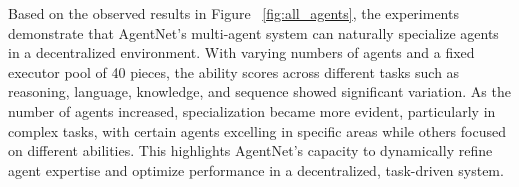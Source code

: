 \documentclass{article}
\begin{document}
Based on the observed results in Figure ~\ref{fig:all_agents}, the experiments demonstrate that AgentNet's multi-agent system can naturally specialize agents in a decentralized environment. With varying numbers of agents and a fixed executor pool of 40 pieces, the ability scores across different tasks such as reasoning, language, knowledge, and sequence showed significant variation. As the number of agents increased, specialization became more evident, particularly in complex tasks, with certain agents excelling in specific areas while others focused on different abilities. This highlights AgentNet's capacity to dynamically refine agent expertise and optimize performance in a decentralized, task-driven system.
\end{document}
